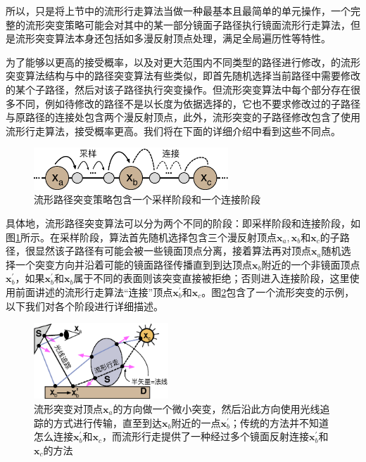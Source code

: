 所以，\cite{a:ManifoldExplorationAMarkovChainMonteCarloTechniqueforRenderingSceneswithDifficultSpecularTransport}只是将上节中的流形行走算法当做一种最基本且最简单的单元操作，一个完整的流形突变策略可能会对其中的某一部分镜面子路径执行镜面流形行走算法，但是流形突变算法本身还包括如多漫反射顶点处理，满足全局遍历性等特性。

为了能够以更高的接受概率，以及对更大范围内不同类型的路径进行修改，\cite{a:ManifoldExplorationAMarkovChainMonteCarloTechniqueforRenderingSceneswithDifficultSpecularTransport}的流形突变算法结构与\cite{a:MetropolisLightTransport}中的路径突变算法有些类似，即首先随机选择当前路径中需要修改的某个子路径，然后对该子路径执行突变操作。但流形突变算法中每个部分存在很多不同，例如待修改的路径不是以长度为依据选择的，它也不要求修改过的子路径与原路径的连接处包含两个漫反射顶点，此外，流形突变的子路径修改包含了使用流形行走算法，接受概率更高。我们将在下面的详细介绍中看到这些不同点。

\begin{figure}
	\sidecaption
	\includegraphics[width=0.65\textwidth]{figures/mlt/manifold-perturbation}
	\caption{流形路径突变策略包含一个采样阶段和一个连接阶段}
	\label{f:mlt-manifold-perturbation}
\end{figure}

具体地，流形路径突变算法可以分为两个不同的阶段：即采样阶段和连接阶段，如图\ref{f:mlt-manifold-perturbation}所示。在采样阶段，算法首先随机选择包含三个漫反射顶点$\mathbf{x}_a,\mathbf{x}_b$和$\mathbf{x}_c$的子路径，很显然该子路径有可能会被一些镜面顶点分离，接着算法再对顶点$\mathbf{x}_a$随机选择一个突变方向并沿着可能的镜面路径传播直到到达顶点$\mathbf{x}_b$附近的一个非镜面顶点$\mathbf{x}^{'}_b$，如果$\mathbf{x}^{'}_b$和$\mathbf{x}_b$属于不同的表面则该突变直接被拒绝；否则进入连接阶段，这里使用前面讲述的流形行走算法“连接”顶点$\mathbf{x}^{'}_b$和$\mathbf{x}_c$。图\ref{f:mlt-manifold-perturbation-example}包含了一个流形突变的示例，以下我们对各个阶段进行详细描述。

\begin{figure}
	\sidecaption
	\includegraphics[width=0.45\textwidth]{figures/mlt/manifold-perturbation-example}
	\caption{流形突变对顶点$\mathbf{x}_a$的方向做一个微小突变，然后沿此方向使用光线追踪的方式进行传输，直至到达$\mathbf{x}_b$附近的一点$\mathbf{x}^{'}_b$；传统的方法并不知道怎么连接$\mathbf{x}^{'}_b$和$\mathbf{x}_c$，而流形行走提供了一种经过多个镜面反射连接$\mathbf{x}^{'}_b$和$\mathbf{x}_c$的方法}
	\label{f:mlt-manifold-perturbation-example}
\end{figure}




